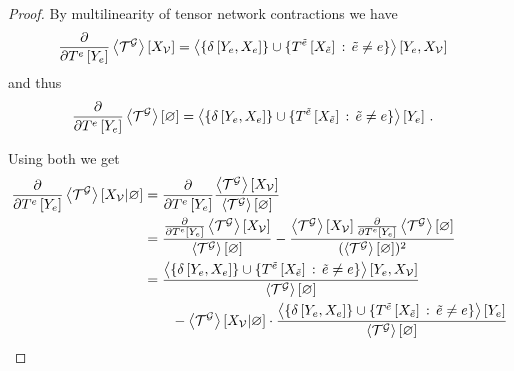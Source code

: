 \begin{proof}
    By multilinearity of tensor network contractions we have
    \begin{align*}
        \frac{\partial }{\partial T^{e}\left[Y_{e}\right]} \left\langle \mathcal{T}^{\mathcal{G}}\right\rangle \left[ X_{\mathcal{V}} \right]
        & = \left\langle \{\delta\left[Y_{e},X_{e}\right]\}\cup\{T^{\tilde{e}}\left[X_{\tilde{e}}\right] \, : \, \tilde{e}\neq e \}\right\rangle \left[ Y_{e},X_{\mathcal{V}} \right]
    \end{align*}
    and thus
    \begin{align*}
        \frac{\partial }{\partial T^{e}\left[Y_{e}\right]} \left\langle \mathcal{T}^{\mathcal{G}}\right\rangle \left[ \varnothing \right]
        & = \left\langle \{\delta\left[Y_{e},X_{e}\right]\}\cup\{T^{\tilde{e}}\left[X_{\tilde{e}}\right] \, : \, \tilde{e}\neq e \}\right\rangle \left[ Y_{e} \right] \, .
    \end{align*}

    Using both we get
    \begin{align}
        \frac{\partial }{\partial T^{e}\left[Y_{e}\right]} \left\langle \mathcal{T}^{\mathcal{G}}\right\rangle \left[ X_{\mathcal{V}} | \varnothing \right]
        & = \frac{\partial }{\partial T^{e}\left[Y_{e}\right]}  \frac{\left\langle \mathcal{T}^{\mathcal{G}}\right\rangle \left[ X_{\mathcal{V}} \right]}{\left\langle \mathcal{T}^{\mathcal{G}}\right\rangle \left[ \varnothing \right]} \nonumber \\
        & = \frac{ \frac{\partial }{\partial T^{e}\left[Y_{e}\right]} \left\langle \mathcal{T}^{\mathcal{G}}\right\rangle \left[ X_{\mathcal{V}} \right]}{\left\langle \mathcal{T}^{\mathcal{G}}\right\rangle \left[ \varnothing \right]}
        - \frac{ \left\langle \mathcal{T}^{\mathcal{G}}\right\rangle \left[ X_{\mathcal{V}} \right] \frac{\partial }{\partial T^{e}\left[Y_{e}\right]} \left\langle \mathcal{T}^{\mathcal{G}}\right\rangle \left[ \varnothing \right] }{(\left\langle \mathcal{T}^{\mathcal{G}}\right\rangle \left[ \varnothing \right])^2} \nonumber \\
        & = \frac{ \left\langle \{\delta\left[Y_{e},X_{e}\right]\}\cup\{T^{\tilde{e}}\left[X_{\tilde{e}}\right] \, : \, \tilde{e}\neq e \}\right\rangle \left[ Y_{e},X_{\mathcal{V}} \right]}{\left\langle \mathcal{T}^{\mathcal{G}}\right\rangle \left[ \varnothing \right]} \nonumber \\
        & \quad\quad - \left\langle \mathcal{T}^{\mathcal{G}}\right\rangle \left[ X_{\mathcal{V}} | \varnothing \right] \cdot  \frac{\left\langle \{\delta\left[Y_{e},X_{e}\right]\}\cup\{T^{\tilde{e}}\left[X_{\tilde{e}}\right] \, : \, \tilde{e}\neq e \}\right\rangle \left[ Y_{e} \right]}{\left\langle \mathcal{T}^{\mathcal{G}}\right\rangle \left[ \varnothing \right]} \label{eq:differentiatingMNpreresult}
    \end{align}


\end{proof}
